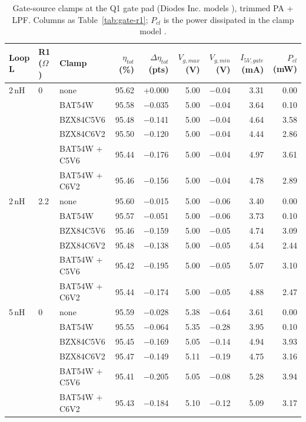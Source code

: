 \begin{table}[tbp]\centering\footnotesize\setlength{\tabcolsep}{3.5pt}
\caption{Gate-source clamps at the Q1 gate pad (Diodes Inc. models \cite{diodesSpice}), trimmed PA + LPF\simv. Columns as Table~\ref{tab:gate-r1}; $P_{cl}$ is the power dissipated in the clamp model \cite{projsim}.}\label{tab:gate-clamp}
\begin{tabular}{@{}lllrrrrrr@{}}\toprule
Loop L & R1 ($\Omega$) & Clamp & $\eta_{tot}$ (\%) & $\Delta\eta_{tot}$ (pts) & $V_{g,max}$ (V) & $V_{g,min}$ (V) & $I_{5V,gate}$ (mA) & $P_{cl}$ (mW) \\ \midrule
2\,nH & 0 & none & 95.62 & +0.000 & 5.00 & $-$0.04 & 3.31 & 0.00 \\
 &  & BAT54W & 95.58 & $-$0.035 & 5.00 & $-$0.04 & 3.64 & 0.10 \\
 &  & BZX84C5V6 & 95.48 & $-$0.141 & 5.00 & $-$0.04 & 4.64 & 3.58 \\
 &  & BZX84C6V2 & 95.50 & $-$0.120 & 5.00 & $-$0.04 & 4.44 & 2.86 \\
 &  & BAT54W + C5V6 & 95.44 & $-$0.176 & 5.00 & $-$0.04 & 4.97 & 3.61 \\
 &  & BAT54W + C6V2 & 95.46 & $-$0.156 & 5.00 & $-$0.04 & 4.78 & 2.89 \\
\midrule
2\,nH & 2.2 & none & 95.60 & $-$0.015 & 5.00 & $-$0.06 & 3.40 & 0.00 \\
 &  & BAT54W & 95.57 & $-$0.051 & 5.00 & $-$0.06 & 3.73 & 0.10 \\
 &  & BZX84C5V6 & 95.46 & $-$0.159 & 5.00 & $-$0.05 & 4.74 & 3.09 \\
 &  & BZX84C6V2 & 95.48 & $-$0.138 & 5.00 & $-$0.05 & 4.54 & 2.44 \\
 &  & BAT54W + C5V6 & 95.42 & $-$0.195 & 5.00 & $-$0.05 & 5.07 & 3.10 \\
 &  & BAT54W + C6V2 & 95.44 & $-$0.174 & 5.00 & $-$0.05 & 4.88 & 2.47 \\
\midrule
5\,nH & 0 & none & 95.59 & $-$0.028 & 5.38 & $-$0.64 & 3.61 & 0.00 \\
 &  & BAT54W & 95.55 & $-$0.064 & 5.35 & $-$0.28 & 3.95 & 0.10 \\
 &  & BZX84C5V6 & 95.45 & $-$0.169 & 5.05 & $-$0.14 & 4.94 & 3.93 \\
 &  & BZX84C6V2 & 95.47 & $-$0.149 & 5.11 & $-$0.19 & 4.75 & 3.16 \\
 &  & BAT54W + C5V6 & 95.41 & $-$0.205 & 5.05 & $-$0.08 & 5.28 & 3.94 \\
 &  & BAT54W + C6V2 & 95.43 & $-$0.184 & 5.10 & $-$0.12 & 5.09 & 3.17 \\
\bottomrule
\end{tabular}\end{table}
